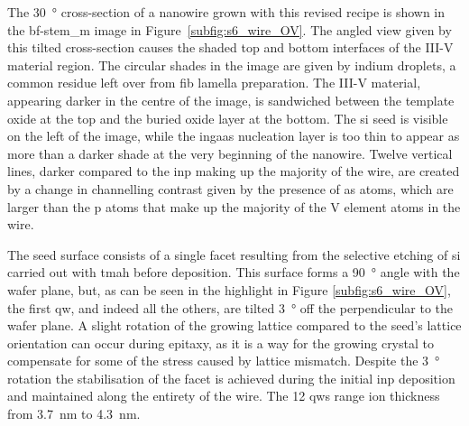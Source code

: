 The \qty{30}{\degree} cross-section of a nanowire grown with this revised recipe is shown in the \acs{bf}-\acs{stem_m} image in Figure~\ref{subfig:s6_wire_OV}. The angled view given by this tilted cross-section causes the shaded top and bottom interfaces of the III-V material region. The circular shades in the image are given by indium droplets, a common residue left over from \acs{fib} lamella preparation. The III-V material, appearing darker in the centre of the image, is sandwiched between the template oxide at the top and the buried oxide layer at the bottom. The \acs{si} seed is visible on the left of the image, while the \acs{ingaas} nucleation layer is too thin to appear as more than a darker shade at the very beginning of the nanowire. Twelve vertical lines, darker compared to the \acs{inp} making up the majority of the wire, are created by a change in channelling contrast given by the presence of \acl{as} atoms, which are larger than the \acl{p} atoms that make up the majority of the V element atoms in the wire.

The seed surface consists of a single  facet resulting from the selective etching of \acs{si} carried out with \acs{tmah} before deposition. This surface forms a \qty{90}{\degree} angle with the wafer plane, but, as can be seen in the highlight in Figure \ref{subfig:s6_wire_OV}, the first \acl{qw}, and indeed all the others, are tilted \qty{3}{\degree} off the perpendicular to the wafer plane. A slight rotation of the growing lattice compared to the seed's lattice orientation can occur during epitaxy, as it is a way for the growing crystal to compensate for some of the stress caused by lattice mismatch. Despite the \qty{3}{\degree} rotation the stabilisation of the  facet is achieved during the initial \acs{inp} deposition and maintained along the entirety of the wire. The \num{12} \acl{qw}s range ion thickness from \qty{3.7}{\nano\metre} to \qty{4.3}{\nano\metre}.

